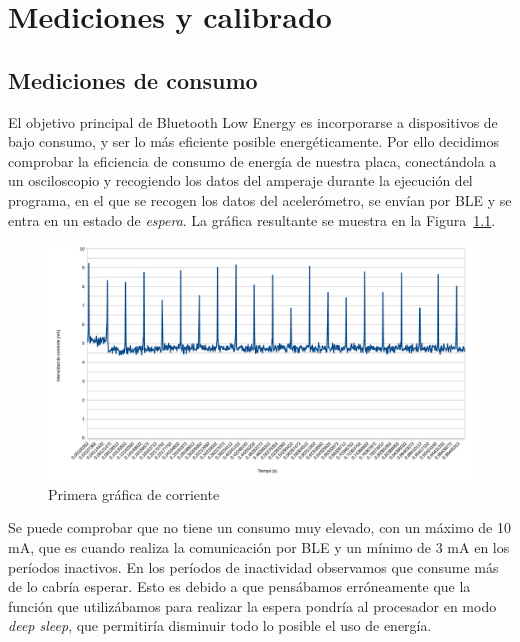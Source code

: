 \cleardoublepage

\chapter{Mediciones y calibrado}
\label{makereference7}

\section{Mediciones de consumo}

El objetivo principal de Bluetooth Low Energy es incorporarse a dispositivos de bajo consumo, y ser lo más eficiente posible energéticamente. Por ello decidimos comprobar la eficiencia de consumo de energía de nuestra placa, conectándola a un osciloscopio y recogiendo los datos del amperaje durante la ejecución del programa, en el que se recogen los datos del acelerómetro, se envían por BLE y se entra en un estado de \textit{espera}. La gráfica resultante se muestra en la Figura~\ref{figuraConsumoMayo}.

\begin{figure}[h]%
	\centering
    \includegraphics[width=\textwidth]{figures/consumo_mayo2.png}
    \caption[Primera gráfica de corriente]{Primera gráfica de corriente}
   	\label{figuraConsumoMayo}
\end{figure}

Se puede comprobar que no tiene un consumo muy elevado, con un máximo de 10 mA, que es cuando realiza la comunicación por BLE y un mínimo de 3 mA en los períodos inactivos. En los períodos de inactividad observamos que consume más de lo cabría esperar. Esto es debido a que pensábamos erróneamente que la función que utilizábamos para realizar la espera pondría al procesador en modo \textit{deep sleep}, que permitiría disminuir todo lo posible el uso de energía.

